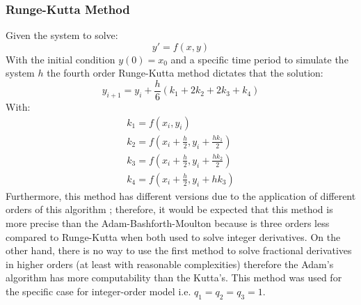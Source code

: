         \subsubsection{Runge-Kutta Method}
        	Given the system to solve:
            \begin{equation}
            	y' = f(x,y)
            \end{equation}
            With the initial condition $y(0)=x_0$ and a specific time period to simulate the system $h$ the fourth order Runge-Kutta method dictates that the solution:
            \begin{equation}
            	y_{i+1} = y_i + \frac{h}{6}(k_1 + 2k_2 + 2k_3 + k_4)
            \end{equation}
            With:
            \begin{equation}
			\begin{array}{ll}
            	k_1 = f(x_i, y_i) \\
                k_2 = f(x_i + \frac{h}{2}, y_i + \frac{hk_1}{2}) \\
                k_3 = f(x_i + \frac{h}{2}, y_i + \frac{hk_2}{2}) \\
                k_4 = f(x_i + \frac{h}{2}, y_i + hk_3)
    		\end{array}
\end{equation}
		Furthermore, this method has different versions due to the application of different orders of this algorithm \cite{kutta}; therefore, it would be expected that this method is more precise than the Adam-Bashforth-Moulton because is three orders less compared to Runge-Kutta when both used to solve integer derivatives. On the other hand, there is no way to use the first method to solve fractional derivatives in higher orders (at least with reasonable complexities) therefore the Adam's algorithm has more computability than the Kutta's. 
            This method was used for the specific case for integer-order model i.e. $q_1=q_2=q_3=1$.
